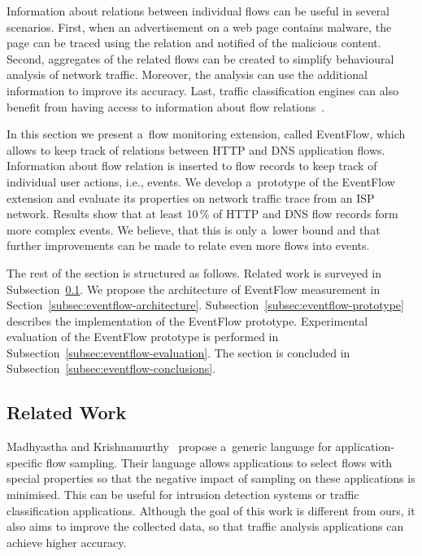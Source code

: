 Information about relations between individual flows can be useful in several scenarios. First, when an advertisement on a web page contains malware, the page can be traced using the relation and notified of the malicious content. Second, aggregates of the related flows can be created to simplify behavioural analysis of network traffic. Moreover, the analysis can use the additional information to improve its accuracy. Last, traffic classification engines can also benefit from having access to information about flow relations~\cite{Wang-2014-Internet}.

In this section we present a~flow monitoring extension, called EventFlow, which allows to keep track of relations between HTTP and DNS application flows. Information about flow relation is inserted to flow records to keep track of individual user actions, i.e., events. We develop a~prototype of the EventFlow extension and evaluate its properties on network traffic trace from an ISP network. Results show that at least 10\,\% of HTTP and DNS flow records form more complex events. We believe, that this is only a~lower bound and that further improvements can be made to relate even more flows into events.

The rest of the section is structured as follows. Related work is surveyed in Subsection~\ref{subsec:eventflow-related_work}. We propose the architecture of EventFlow measurement in Section~\ref{subsec:eventflow-architecture}. Subsection~\ref{subsec:eventflow-prototype} describes the implementation of the EventFlow prototype. Experimental evaluation of the EventFlow prototype is performed in Subsection~\ref{subsec:eventflow-evaluation}. The section is concluded in Subsection~\ref{subsec:eventflow-conclusions}.


\subsection{Related Work} \label{subsec:eventflow-related_work}

Madhyastha and Krishnamurthy~\cite{Madhyastha-2008-Generic} propose a~generic language for application-specific flow sampling. Their language allows applications to select flows with special properties so that the negative impact of sampling on these applications is minimised. This can be useful for intrusion detection systems or traffic classification applications. Although the goal of this work is different from ours, it also aims to improve the collected data, so that traffic analysis applications can achieve higher accuracy.


